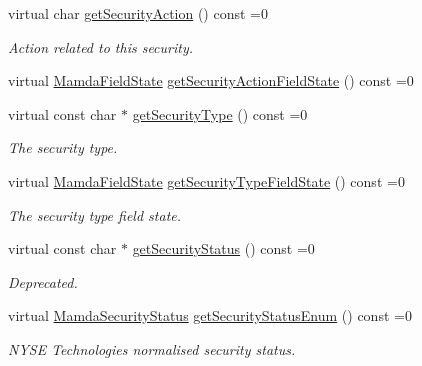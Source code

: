 \begin{CompactItemize}
\item 
virtual char \hyperlink{classWombat_1_1MamdaSecStatusRecap_6cbee9945c643eff18bbe078821de01b}{get\-Security\-Action} () const =0
\begin{CompactList}\small\item\em Action related to this security. \item\end{CompactList}\item 
virtual \hyperlink{namespaceWombat_93aac974f2ab713554fd12a1fa3b7d2a}{Mamda\-Field\-State} \hyperlink{classWombat_1_1MamdaSecStatusRecap_2b3b1757e4d654f75e81bbfc98db9bde}{get\-Security\-Action\-Field\-State} () const =0
\item 
virtual const char $\ast$ \hyperlink{classWombat_1_1MamdaSecStatusRecap_2596c31a5b174f0e2fd41a1c7cc7b32f}{get\-Security\-Type} () const =0
\begin{CompactList}\small\item\em The security type. \item\end{CompactList}\item 
virtual \hyperlink{namespaceWombat_93aac974f2ab713554fd12a1fa3b7d2a}{Mamda\-Field\-State} \hyperlink{classWombat_1_1MamdaSecStatusRecap_89f057289668aaca75848986d4e8a386}{get\-Security\-Type\-Field\-State} () const =0
\begin{CompactList}\small\item\em The security type field state. \item\end{CompactList}\item 
virtual const char $\ast$ \hyperlink{classWombat_1_1MamdaSecStatusRecap_d7bd3380fa057d4de729bff89d649b57}{get\-Security\-Status} () const =0
\begin{CompactList}\small\item\em Deprecated. \item\end{CompactList}\item 
virtual \hyperlink{namespaceWombat_073e683b7aeffa26cf3d2791dda32b4b}{Mamda\-Security\-Status} \hyperlink{classWombat_1_1MamdaSecStatusRecap_79969c1a88df2ff54d7746876cebb653}{get\-Security\-Status\-Enum} () const =0
\begin{CompactList}\small\item\em NYSE Technologies normalised security status. \item\end{CompactList}\item 

\end{CompactItemize}
